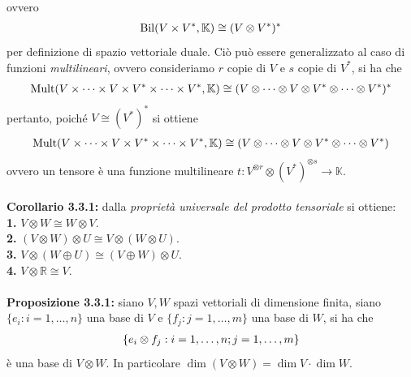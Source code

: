 \documentclass{article}
\begin{document}
ovvero
\begin{gather}
    \mathrm{Bil}(V \times V^*, \mathbb{K}) \cong (V \otimes V^*)^* \notag
\end{gather}
per definizione di spazio vettoriale duale. Ciò può essere generalizzato al caso di funzioni \textit{multilineari}, ovvero consideriamo $r$ copie di $V$ e $s$ copie di $V^*$, si ha che
\begin{gather}
    \mathrm{Mult}(V \times \dots \times V \times V^* \times \dots \times V^*, \mathbb{K}) \cong (V \otimes \dots \otimes V \otimes V^* \otimes \dots \otimes V^*)^* \notag
\end{gather}
pertanto, poiché $V \cong (V^*)^*$ si ottiene
\begin{gather}
    \mathrm{Mult}(V \times \dots \times V \times V^* \times \dots \times V^*, \mathbb{K}) \cong (V \otimes \dots \otimes V \otimes V^* \otimes \dots \otimes V^*) \notag
\end{gather}
ovvero un tensore è una funzione multilineare $t : V^{\otimes r} \otimes (V^*)^{\otimes s} \longrightarrow \mathbb{K}$. \\ \\
\textbf{Corollario 3.3.1:} dalla \textit{proprietà universale del prodotto tensoriale} si ottiene: \\
\textbf{1.} $V \otimes W \cong W \otimes V$. \\
\textbf{2.} $(V \otimes W) \otimes U \cong V \otimes (W \otimes U)$. \\
\textbf{3.} $V \otimes (W \oplus U) \cong (V \oplus W) \otimes U$. \\
\textbf{4.} $V \otimes \mathbb{R} \cong V$. \\ \\
\textbf{Proposizione 3.3.1:} siano $V, W$ spazi vettoriali di dimensione finita, siano $\{ e_i : i = 1, \dots, n \}$ una base di $V$ e $\{ f_j : j = 1, \dots, m \}$ una base di $W$, si ha che
\begin{gather}
    \{ e_i \otimes f_j : i = 1, \dots, n; j = 1, \dots, m \} \notag
\end{gather}
è una base di $V \otimes W$. In particolare $\dim (V \otimes W) = \dim V \cdot \dim W$. \\
\end{document}
